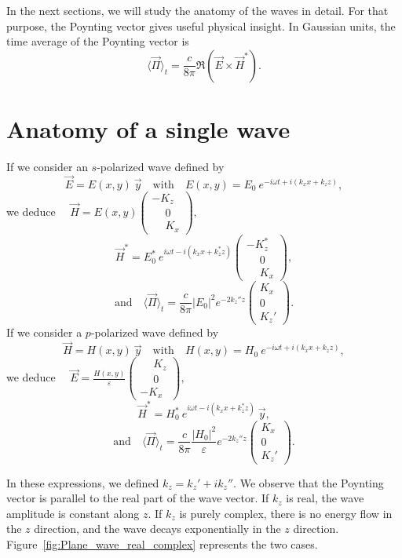 In the next sections, we will study the anatomy of the waves in detail. 
For that purpose, the Poynting vector gives useful physical insight.
In Gaussian units, the time average of the Poynting vector is
$$\langle \vec{\Pi} \rangle_t  =  
\frac{c}{8\pi} \Re\left(\vec{E}\times \vec{H}^*\right).$$

\section{Anatomy of a single wave}

If we consider an $s$-polarized wave defined by 
$$
\vec E = E(x,y)\ \vec y
\quad\mathrm{with}\quad
E(x,y) = E_0\ e^{-i\omega t + i(k_x x + k_z z)},$$
we deduce
$\quad
\vec H = E(x,y)
\begin{pmatrix}
- K_z\\
\phantom{-} 0\\
\phantom{-} K_x
\end{pmatrix},
$
$$
\vec H^* = E_0^*\ e^{i\omega t - i(k_x x + k_z^* z)}
\begin{pmatrix}
- K_z^*\\
\phantom{-} 0\\
\phantom{-} K_x
\end{pmatrix},
$$
$$
\mathrm{and}\quad
\langle \vec{\Pi} \rangle_t  = \frac{c}{8\pi} 
|E_0|^2 e^{-2 k_z'' z}
\begin{pmatrix}
K_x\\
0\\
K_z'
\end{pmatrix}.
$$
If we consider a $p$-polarized wave defined by 
$$
\vec H = H(x,y)\ \vec y
\quad\mathrm{with}\quad
H(x,y) = H_0\ e^{-i\omega t + i(k_x x + k_z z)},$$
we deduce
$\quad
\vec E = \displaystyle \frac{H(x,y)}{\varepsilon}
\begin{pmatrix}
\phantom{-} K_z\\
\phantom{-} 0\\
- K_x
\end{pmatrix},
$
\begin{equation*}
\vec H^* = H_0^*\ e^{i\omega t - i(k_x x + k_z^* z)}\ \vec y,
\end{equation*}
$$
\mathrm{and}\quad
\langle \vec{\Pi} \rangle_t  = \frac{c}{8\pi} 
\frac{|H_0|^2}{\varepsilon} e^{-2 k_z'' z}
\begin{pmatrix}
K_x\\
0\\
K_z'
\end{pmatrix}.
$$

In these expressions, we defined $k_z = k_z' + i k_z''$.
We observe that the Poynting vector is parallel to the real part of the wave vector.
If $k_z$ is real, the wave amplitude is constant along $z$.
If $k_z$ is purely complex, there is no energy flow in the $z$ direction, and the wave decays exponentially in the $z$ direction.
Figure~\ref{fig:Plane_wave_real_complex} represents the two cases.

